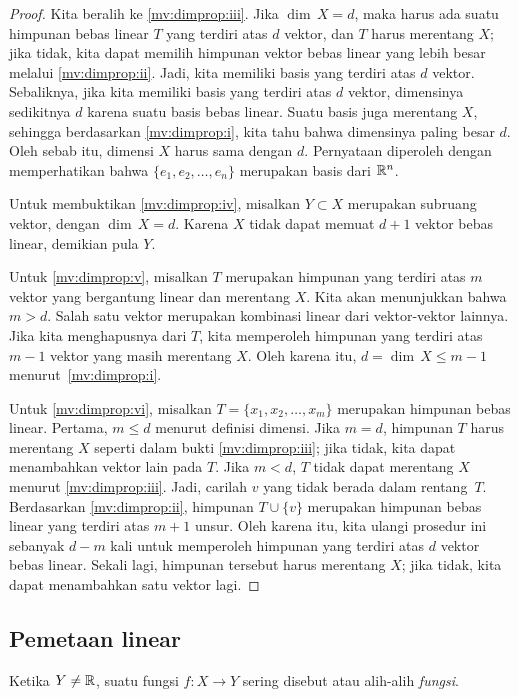 \begin{proof}
Kita beralih ke \ref{mv:dimprop:iii}.
Jika $\dim \, X = d$,
maka harus ada suatu himpunan bebas linear $T$ yang terdiri atas $d$ vektor,
dan $T$ harus merentang $X$; jika tidak, kita dapat memilih himpunan vektor bebas
linear yang lebih besar melalui \ref{mv:dimprop:ii}.
Jadi, kita memiliki basis yang terdiri atas $d$ vektor.
Sebaliknya, jika kita memiliki basis yang terdiri atas $d$ vektor,
dimensinya sedikitnya $d$ karena suatu basis bebas linear.
Suatu basis juga merentang $X$, sehingga
berdasarkan \ref{mv:dimprop:i}, kita tahu bahwa dimensinya paling besar $d$.
Oleh sebab itu, dimensi $X$ harus sama dengan $d$.
Pernyataan  diperoleh dengan memperhatikan bahwa
$\{ e_1, e_2, \ldots, e_n \}$ merupakan basis dari ${\mathbb{R}}^n$.

Untuk membuktikan \ref{mv:dimprop:iv},
misalkan $Y \subset X$ merupakan subruang vektor,
dengan $\dim \, X = d$.  Karena $X$ tidak dapat memuat $d+1$ vektor bebas
linear, demikian pula $Y$.

Untuk \ref{mv:dimprop:v}, misalkan $T$ merupakan himpunan yang terdiri atas $m$ vektor
yang bergantung linear
dan merentang $X$.
Kita akan menunjukkan bahwa $m > d$.
Salah satu
vektor merupakan kombinasi linear dari vektor-vektor lainnya.  Jika kita menghapusnya
dari $T$, kita memperoleh himpunan yang terdiri atas $m-1$ vektor yang masih merentang $X$.
Oleh karena itu,
$d = \dim \, X \leq m-1$ menurut~\ref{mv:dimprop:i}.

Untuk \ref{mv:dimprop:vi}, misalkan $T = \{ x_1, x_2, \ldots, x_m \}$ merupakan
himpunan bebas linear.  Pertama, $m \leq d$ menurut definisi dimensi.
Jika $m=d$, himpunan $T$ harus merentang $X$ seperti dalam bukti \ref{mv:dimprop:iii};
jika tidak, kita dapat menambahkan vektor lain pada $T$.
Jika $m < d$,  $T$ tidak dapat merentang $X$ menurut \ref{mv:dimprop:iii}.
Jadi, carilah $v$ yang tidak berada dalam rentang~$T$.
Berdasarkan \ref{mv:dimprop:ii}, himpunan $T \cup \{ v \}$ merupakan
himpunan bebas linear yang terdiri atas $m+1$ unsur.
Oleh karena itu, kita ulangi prosedur ini sebanyak $d-m$ kali untuk
memperoleh himpunan yang terdiri atas $d$ vektor bebas linear.
Sekali lagi, himpunan tersebut harus merentang $X$; jika tidak, kita dapat menambahkan satu vektor lagi.
\end{proof}

\subsection{Pemetaan linear}

Ketika $Y \neq {\mathbb{R}}$,
suatu fungsi $f \colon X \to Y$ sering disebut
\emph{} atau \emph{}
alih-alih \emph{fungsi}.

